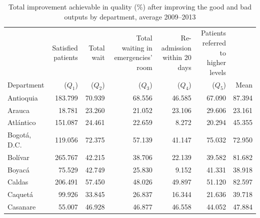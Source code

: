 \documentclass[11pt,a4paper,oneside]{article}
\begin{document}
\begin{table}
\centering
\caption{Total improvement achievable in quality (\%) after improving the good and bad outputs by department, average 2009--2013}
\label{tbl:revised_table_9}
\footnotesize
\begin{tabular}{lrrrrrr}
\toprule
& \parbox[c]{25mm}{\centering Satisfied patients} & \parbox[c]{25mm}{\centering Total wait} & \parbox[c]{25mm}{\centering Total waiting in emergencies' room} & \parbox[c]{25mm}{\centering Re-admission within 20 days} & \parbox[c]{25mm}{\centering Patients referred to higher levels} &  \\
\cmidrule(r){1-6}
Department         & ($Q_1$)       & ($Q_2$)                               & ($Q_3$)                       & ($Q_4$)                               & ($Q_5$)   & \parbox[c]{25mm}{\centering  Mean}   \\
\midrule
Antioquia          & 183.799    & 70.939                             & 68.556                     & 46.585                             & 67.090 & 87.394 \\
Arauca             & 18.781     & 23.260                             & 21.052                     & 23.106                             & 29.606 & 23.161 \\
Atlántico          & 151.087    & 24.461                             & 22.659                     & 8.272                              & 20.294 & 45.355 \\
Bogotá, D.C.       & 119.056    & 72.375                             & 57.139                     & 41.147                             & 75.032 & 72.950 \\
Bolívar            & 265.767    & 42.215                             & 38.706                     & 22.139                             & 39.582 & 81.682 \\
Boyacá             & 75.529     & 42.749                             & 25.830                     & 9.152                              & 41.331 & 38.918 \\
Caldas             & 206.491    & 57.450                             & 48.026                     & 49.897                             & 51.120 & 82.597 \\
Caquetá            & 99.926     & 33.845                             & 26.837                     & 16.344                             & 21.636 & 39.718 \\
Casanare           & 55.007     & 46.928                             & 46.877                     & 46.558                             & 44.052 & 47.884 \\

\end{tabular}
\end{table}
\end{document}
